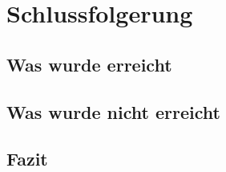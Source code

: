 \section{Schlussfolgerung}
\subsection{Was wurde erreicht}
\subsection{Was wurde nicht erreicht}
\subsection{Fazit}
